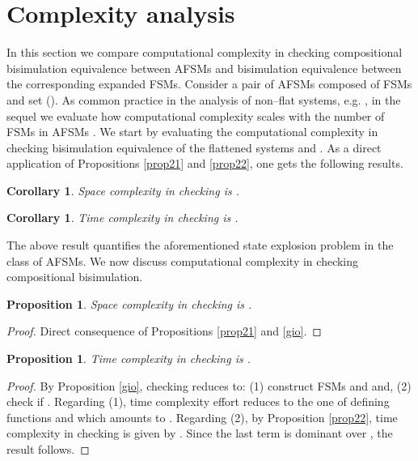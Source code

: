 \documentclass{amsart}
\newtheorem{proposition}[theorem]{Proposition}
\newtheorem{corollary}[theorem]{Corollary}
\theoremstyle{definition}
\theoremstyle{remark}
\numberwithin{equation}{section}
\begin{document}
\section{Complexity analysis}

In this section we compare computational complexity in checking compositional bisimulation equivalence between AFSMs and bisimulation equivalence between the corresponding expanded FSMs. Consider a pair of AFSMs  composed of  FSMs and set  (). As common practice in the analysis of non--flat systems, e.g. \cite{StateExplosion2,StateExplosion1}, in the sequel we evaluate how computational complexity scales with the number  of FSMs in AFSMs . 
We start by evaluating the computational complexity in checking bisimulation equivalence of the flattened systems  and . As a direct application of Propositions \ref{prop21} and \ref{prop22}, one gets the following results.

\begin{corollary}
\label{prop23}
Space complexity in checking  is .
\end{corollary}

\begin{corollary}
\label{prop24}
Time complexity in checking  is . 
\end{corollary}

The above result quantifies the aforementioned state explosion problem \cite{StateExplosion2,StateExplosion1} in the class of AFSMs. We now discuss computational complexity in checking compositional bisimulation. 
\begin{proposition}
\label{prop25}
Space complexity in checking  is .
\end{proposition}

\begin{proof}
Direct consequence of Propositions \ref{prop21} and \ref{gio}. 
\end{proof}

\begin{proposition}
\label{prop26}
Time complexity in checking  is . 
\end{proposition}
\begin{proof}
By Proposition \ref{gio}, checking  reduces to: (1) construct FSMs  and  and, (2) check if . 
Regarding (1), time complexity effort reduces to the one of defining functions  and  which amounts to 
. 
Regarding (2), by Proposition \ref{prop22}, time complexity in checking  is given by .
Since the last term is dominant over , the result follows. 
\end{proof}
\end{document}
